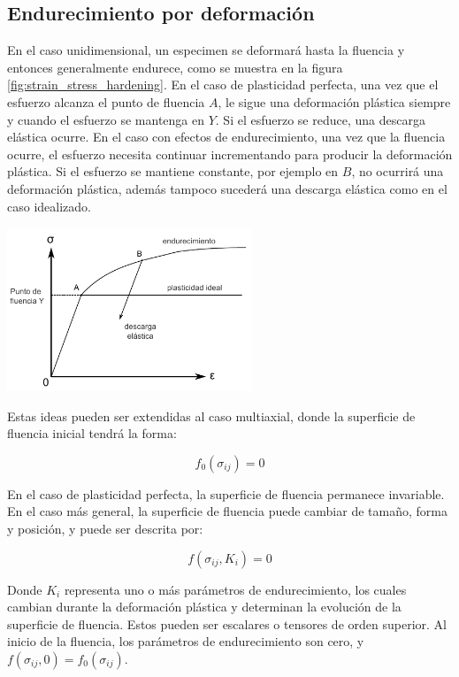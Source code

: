 \subsection{Endurecimiento por deformación}

En el caso unidimensional, un especimen se deformará hasta la fluencia y entonces generalmente 
endurece, como se muestra en la figura \ref{fig:strain_stress_hardening}. En el caso de 
plasticidad perfecta, una vez que el esfuerzo alcanza el punto de fluencia $A$, le sigue una 
deformación plástica siempre y cuando el esfuerzo se mantenga en $Y$. Si el esfuerzo se reduce, 
una descarga elástica ocurre. En el caso con efectos de endurecimiento, una vez que la fluencia 
ocurre, el esfuerzo necesita continuar incrementando para producir la deformación plástica. 
Si el esfuerzo se mantiene constante, por ejemplo en $B$, no ocurrirá una deformación plástica, 
además tampoco sucederá una descarga elástica como en el caso idealizado. ~\cite{kelly2012}

\begin{center}
\includegraphics[width=0.55\textwidth]{src/ch2/strain_stress_hardening}
\label{fig:strain_stress_hardening}
\end{center}

Estas ideas pueden ser extendidas al caso multiaxial, donde la superficie de fluencia inicial 
tendrá la forma:

\begin{equation}
f_0 (\sigma_{ij}) = 0
\end{equation}

En el caso de plasticidad perfecta, la superficie de fluencia permanece invariable. En el caso 
más general, la superficie de fluencia puede cambiar de tamaño, forma y posición, y puede ser 
descrita por:

\begin{equation}
f(\sigma_{ij}, K_i) = 0
\end{equation}

Donde $K_i$ representa uno o más parámetros de endurecimiento, los cuales cambian durante la 
deformación plástica y determinan la evolución de la superficie de fluencia. Estos pueden 
ser escalares o tensores de orden superior. Al inicio de la fluencia, los parámetros de 
endurecimiento son cero, y $f(\sigma_{ij}, 0) = f_0(\sigma_{ij}) $. \\

